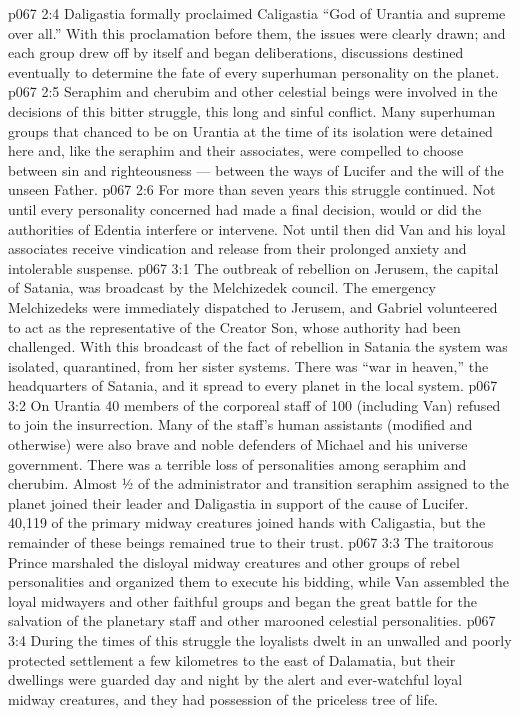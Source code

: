\vs p067 2:4 \pc Daligastia formally proclaimed Caligastia “God of Urantia and supreme over all.” With this proclamation before them, the issues were clearly drawn; and each group drew off by itself and began deliberations, discussions destined eventually to determine the fate of every superhuman personality on the planet.
\vs p067 2:5 Seraphim and cherubim and other celestial beings were involved in the decisions of this bitter struggle, this long and sinful conflict. Many superhuman groups that chanced to be on Urantia at the time of its isolation were detained here and, like the seraphim and their associates, were compelled to choose between sin and righteousness --- between the ways of Lucifer and the will of the unseen Father.
\vs p067 2:6 For more than seven years this struggle continued. Not until every personality concerned had made a final decision, would or did the authorities of Edentia interfere or intervene. Not until then did Van and his loyal associates receive vindication and release from their prolonged anxiety and intolerable suspense.
\vs p067 3:1 The outbreak of rebellion on Jerusem, the capital of Satania, was broadcast by the Melchizedek council. The emergency Melchizedeks were immediately dispatched to Jerusem, and Gabriel volunteered to act as the representative of the Creator Son, whose authority had been challenged. With this broadcast of the fact of rebellion in Satania the system was isolated, quarantined, from her sister systems. There was “war in heaven,” the headquarters of Satania, and it spread to every planet in the local system.
\vs p067 3:2 On Urantia 40 members of the corporeal staff of 100 (including Van) refused to join the insurrection. Many of the staff’s human assistants (modified and otherwise) were also brave and noble defenders of Michael and his universe government. There was a terrible loss of personalities among seraphim and cherubim. Almost ½ of the administrator and transition seraphim assigned to the planet joined their leader and Daligastia in support of the cause of Lucifer. 40,119 of the primary midway creatures joined hands with Caligastia, but the remainder of these beings remained true to their trust.
\vs p067 3:3 The traitorous Prince marshaled the disloyal midway creatures and other groups of rebel personalities and organized them to execute his bidding, while Van assembled the loyal midwayers and other faithful groups and began the great battle for the salvation of the planetary staff and other marooned celestial personalities.
\vs p067 3:4 During the times of this struggle the loyalists dwelt in an unwalled and poorly protected settlement a few kilometres to the east of Dalamatia, but their dwellings were guarded day and night by the alert and ever\hyp{}watchful loyal midway creatures, and they had possession of the priceless tree of life.
